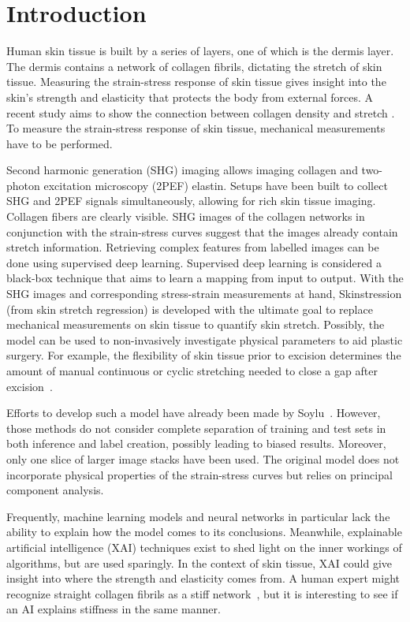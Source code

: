 \section{Introduction}

Human skin tissue is built by a series of layers, one of which is the dermis layer.
The dermis contains a network of collagen fibrils, dictating the stretch of skin tissue.
Measuring the strain-stress response of skin tissue gives insight into the skin's strength and elasticity that protects the body from external forces.
A recent study aims to show the connection between collagen density and stretch .
To measure the strain-stress response of skin tissue, mechanical measurements have to be performed.

Second harmonic generation (SHG) imaging allows imaging collagen and two-photon excitation microscopy (2PEF) elastin.
Setups have been built to collect SHG and 2PEF signals simultaneously, allowing for rich skin tissue imaging.
Collagen fibers are clearly visible.
SHG images of the collagen networks in conjunction with the strain-stress curves suggest that the images already contain stretch information.
Retrieving complex features from labelled images can be done using supervised deep learning.
Supervised deep learning is considered a black-box technique that aims to learn a mapping from input to output.
With the SHG images and corresponding stress-strain measurements at hand, Skinstression (from skin stretch regression) is developed with the ultimate goal to replace mechanical measurements on skin tissue to quantify skin stretch.
Possibly, the model can be used to non-invasively investigate physical parameters to aid plastic surgery.
For example, the flexibility of skin tissue prior to excision determines the amount of manual continuous or cyclic stretching needed to close a gap after excision~.

Efforts to develop such a model have already been made by Soylu~.
However, those methods do not consider complete separation of training and test sets in both inference and label creation, possibly leading to biased results.
Moreover, only one slice of larger image stacks have been used.
The original model does not incorporate physical properties of the strain-stress curves but relies on principal component analysis.

Frequently, machine learning models and neural networks in particular lack the ability to explain how the model comes to its conclusions.
Meanwhile, explainable artificial intelligence (XAI) techniques exist to shed light on the inner workings of algorithms, but are used sparingly.
In the context of skin tissue, XAI could give insight into where the strength and elasticity comes from.
A human expert might recognize straight collagen fibrils as a stiff network~, but it is interesting to see if an AI explains stiffness in the same manner.


